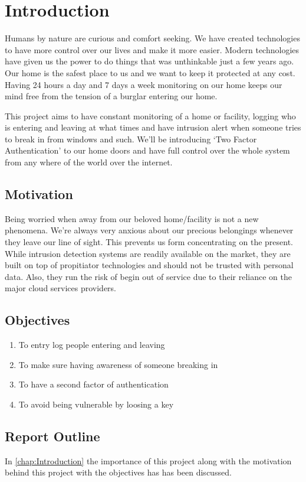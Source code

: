 \chapter{Introduction}
\label{chap:Introduction}
Humans by nature are curious and comfort seeking. We have created technologies to have more control over our lives and 
make it more easier. Modern technologies have given us the power to do things that was unthinkable just a few years ago. 
Our home is the safest place to us and we want to keep it protected at any cost. Having 24 hours a day and 7 days a week 
monitoring on our home keeps our mind free from the tension of a burglar entering our home. 

This project aims to have constant monitoring of a home or facility, logging who is entering and leaving at what times
and have intrusion alert when someone tries to break in from windows and such. We'll be introducing `Two Factor Authentication'
to our home doors and have full control over the whole system from any where of the world over the internet. 

\section{Motivation}
Being worried when away from our beloved home/facility is not a new phenomena. We're always very anxious about our 
precious belongings whenever they leave our line of sight. This prevents us form concentrating on the present. While intrusion
detection systems are readily available on the market, they are built on top of propitiator technologies and should not be 
trusted with personal data. Also, they run the risk of begin out of service due to their reliance on the major cloud services 
providers. 

\section{Objectives}
\begin{enumerate}
    \item To entry log people entering and leaving
    \item To make sure having awareness of someone breaking in 
    \item To have a second factor of authentication
    \item To avoid being vulnerable by loosing a key
\end{enumerate}

\section{Report Outline}
In \autoref{chap:Introduction} the importance of this project along with the motivation behind this project with the objectives has 
has been discussed.

